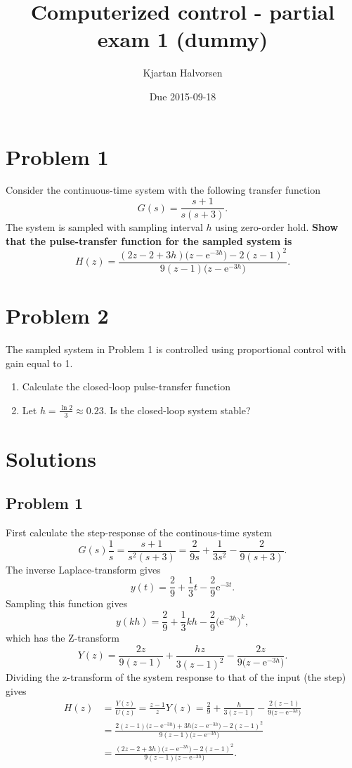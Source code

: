 \documentclass{scrartcl}
\title{Computerized control - partial exam 1 (dummy)}
\author{Kjartan Halvorsen}
\date{Due 2015-09-18}
\newcommand*{\mexp}[1]{\ensuremath{\mathrm{e}^{#1}}}
\newcommand*{\zethree}{\big(z - \mexp{-3h}\big)}
\begin{document}
\maketitle



\section*{Problem 1}
\label{sec-1}

Consider the continuous-time system with the following transfer function
\[ G(s) = \frac{s+1}{s(s+3)}. \]
The system is sampled with sampling interval $h$ using zero-order hold. \textbf{Show that the pulse-transfer function for the sampled system is}
\[ H(z) = \frac{(2z-2+3h)\zethree{} - 2(z-1)^2}{9(z-1)\zethree{}}. \]
\section*{Problem 2}
\label{sec-2}

  The sampled system in Problem 1 is controlled using proportional control with gain equal to 1. 
  \begin{center}
  
  \end{center}

\begin{enumerate}
\item Calculate the closed-loop pulse-transfer function
\item Let $h=\frac{\ln 2}{3} \approx 0.23$. Is the closed-loop system stable?
\end{enumerate}
\section*{Solutions}
\label{sec-3}
\subsection*{Problem 1}
\label{sec-3-1}

   First calculate the step-response of the continous-time system
   \[G(s)\frac{1}{s} = \frac{s+1}{s^2(s+3)} = \frac{2}{9s} + \frac{1}{3s^2} - \frac{2}{9(s+3)}.\]
   The inverse Laplace-transform gives
   \[ y(t) = \frac{2}{9} + \frac{1}{3}t - \frac{2}{9}\mexp{-3t}. \]
   Sampling this function gives
   \[ y(kh) = \frac{2}{9} + \frac{1}{3}kh - \frac{2}{9}\big(\mexp{-3h}\big)^k, \]
   which has the Z-transform
   \[Y(z) = \frac{2z}{9(z-1)} + \frac{hz}{3(z-1)^2} - \frac{2z}{9\zethree{}}. \]
   Dividing the z-transform of the system response to that of the input (the step) gives
   \begin{align*}
   H(z) &= \frac{Y(z)}{U(z)} = \frac{z-1}{z}Y(z) = \frac{2}{9} + \frac{h}{3(z-1)} - \frac{2(z-1)}{9\zethree{}}\\
        &= \frac{2(z-1)\zethree{} + 3h\zethree{} - 2(z-1)^2}{9(z-1)\zethree{}}\\
        &= \frac{(2z-2+3h)\zethree - 2(z-1)^2}{9(z-1)\zethree{}}.
   \end{align*}
\end{document}

